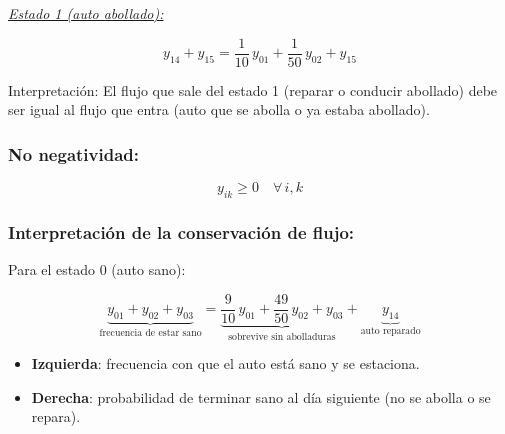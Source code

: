\documentclass[a4paper,11pt]{article}
\begin{document}
\vspace{0.5em}

\textit{\underline{Estado 1 (auto abollado):}}

\[
y_{14} + y_{15} = \frac{1}{10}\,y_{01} + \frac{1}{50}\,y_{02} + y_{15}
\]

Interpretación: El flujo que sale del estado 1 (reparar o conducir abollado) debe ser igual al flujo que entra (auto que se abolla o ya estaba abollado).

\subsubsection{No negatividad:}

\[
y_{ik} \geq 0 \quad \forall\, i, k
\]

\subsubsection{Interpretación de la conservación de flujo:}

Para el estado 0 (auto sano):

\[
\underbrace{y_{01} + y_{02} + y_{03}}_{\text{frecuencia de estar sano}} = \underbrace{\frac{9}{10}\,y_{01} + \frac{49}{50}\,y_{02} + y_{03}}_{\text{sobrevive sin abolladuras}} + \underbrace{y_{14}}_{\text{auto reparado}}
\]

\begin{itemize}
    \item \textbf{Izquierda}: frecuencia con que el auto está sano y se estaciona.
    \item \textbf{Derecha}: probabilidad de terminar sano al día siguiente (no se abolla o se repara).
\end{itemize}
\end{document}
